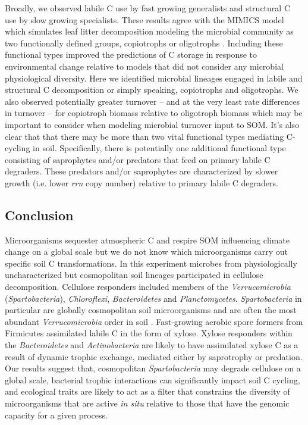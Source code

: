 Broadly, we observed labile C use by fast growing generalists and structural
C use by slow growing specialists. These results agree with the MIMICS model
which simulates leaf litter decomposition modeling the microbial community as
two functionally defined groups, copiotrophs or oligotrophs
\citep{wieder_2014a}. Including these functional types improved the predictions
of C storage in response to environmental change relative to models that did
not consider any microbial physiological diversity. Here we identified
microbial lineages engaged in labile and structural C decomposition or simply
speaking, copiotrophs and oligotrophs. We also observed potentially greater
turnover -- and at the very least rate differences in turnover -- for
copiotroph biomass relative to oligotroph biomass which may be important to
consider when modeling microbial turnover input to SOM. It's also clear that
that there may be more than two vital functional types mediating C-cycling in
soil. Specifically, there is potentially one additional functional type
consisting of saprophytes and/or predators that feed on primary labile
C degraders. These predators and/or saprophytes are characterized by slower
growth (i.e. lower \textit{rrn} copy number) relative to primary labile
C degraders. 

\subsection{Conclusion} 
Microorganisms sequester atmospheric C and respire SOM influencing climate
change on a global scale but we do not know which microorganisms carry out
specific soil C transformations. In this experiment microbes from
physiologically uncharacterized but cosmopolitan soil lineages participated in
cellulose decomposition. Cellulose responders included members of the
\textit{Verrucomicrobia} (\textit{Spartobacteria}), \textit{Chloroflexi},
\textit{Bacteroidetes} and \textit{Planctomycetes}. \textit{Spartobacteria} in
particular are globally cosmopolitan soil microorganisms and are often the most
abundant \textit{Verrucomicrobia} order in soil \citep{Bergmann_2011}.
Fast-growing aerobic spore formers from Firmicutes assimilated labile C in the
form of xylose. Xylose responders within the \textit{Bacteroidetes} and
\textit{Actinobacteria} are likely to have assimilated xylose C as a result of
dynamic trophic exchange, mediated either by saprotrophy or predation. Our
results suggest that, cosmopolitan \textit{Spartobacteria} may degrade
cellulose on a global scale, bacterial trophic interactions can significantly
impact soil C cycling, and ecological traits are likely to act as a filter that
constrains the diversity of microorganisms that are active \textit{in situ}
relative to those that have the genomic capacity for a given process.
